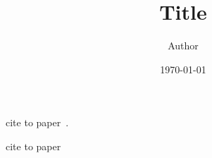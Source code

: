 \documentclass{article}
\title{Title}
\author{Author}
\date{\today}
\begin{document}
cite to paper~\cite{einstein}.

cite to paper~\cite{dirac}

\printbibliography
\end{document}
